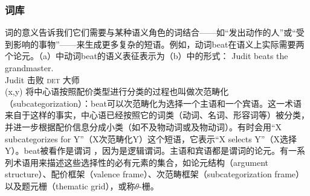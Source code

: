 \subsubsection{词库}
\label{Abschnitt-GB-Lexikon}
词的意义告诉我们它们需要与某种语义角色的词结合——如“发出动作的人”或“受到影响的事物”——来生成更多复杂的短语。例如，动词beat在语义上实际需要两个论元。（a）中动词beat的语义表征表示为（b）中的形式：
\eal
\ex 
\gll Judit beats the grandmaster.\\
Judit 击败 \textsc{det} 大师\\
\ex {}(x,y)
\zl
\noindent
将中心语按照配价类型进行分类的过程也叫做次范畴化（subcategorization）：\label{Seite-Subkategoriesierung}beat可以次范畴化为选择一个主语和一个宾语。这一术语来自于这样的事实，中心语已经按照它的词类（动词、名词、形容词等）被分类，并进一步根据配价信息分成小类（如不及物动词或及物动词）。有时会用“X subcategorizes for Y”（X次范畴化Y）这个短语，它表示“X selects
Y”（X选择Y）。beat被看作是谓词 ，因为是逻辑谓词。主语和宾语都是谓词的论元。有一系列术语用来描述这些选择性的必有元素的集合，如论元结构（argument structure）、配价框架（valence frame）、次范畴框架（subcategorization frame）以及题元栅（thematic grid），或称$\theta$-栅。
